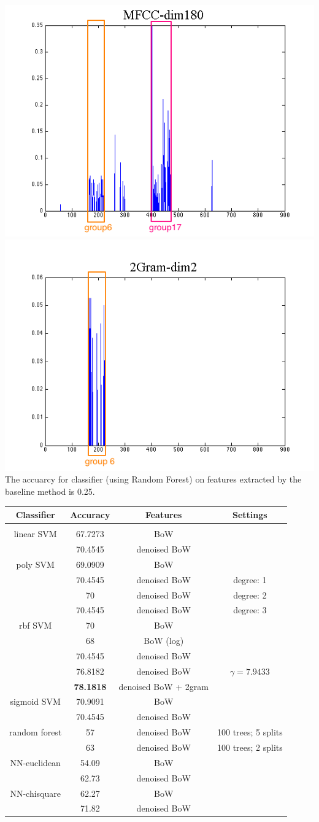 
\includegraphics[width=0.18 \linewidth]{./images/mfcc_180.png}
\includegraphics[width=0.19 \linewidth]{./images/ngram_202.png}\\
\footnotesize
The accuarcy for classifier (using Random Forest) on features extracted by the baseline method is 0.25. 


\begin{tabular}{cccc}
\multicolumn{1}{c}{\bf Classifier }&\multicolumn{1}{c}{\bf Accuracy}  &\multicolumn{1}{c}{\bf Features} &\multicolumn{1}{c}{\bf Settings}
\\ \hline \\
linear SVM		&67.7273 		&BoW 		&  \\
			& 70.4545  	& denoised BoW 	&  \\
poly SVM		&69.0909		&BoW 		&  \\
			& 70.4545  	& denoised BoW 	& degree: 1  \\
			& 70 			& denoised BoW 	& degree: 2  \\
			& 70.4545  	& denoised BoW 	& degree: 3  \\
rbf SVM       	&70 			&BoW 		&  \\
                     	&68  			&  BoW (log) 	&  \\
          		&70.4545  		&  denoised BoW 	&  \\
          		&76.8182  		&  denoised BoW 	&  $\gamma = 7.9433$ \\
          		&{\bf 78.1818}  	&  denoised BoW + 2gram 	&    \\
sigmoid SVM     	&70.9091		&BoW 		&  \\
       			&70.4545  		& denoised BoW 	&  \\
random forest    	&57			& denoised BoW	& 100 trees; 5 splits \\
       			&63  			& denoised BoW 	& 100 trees; 2 splits \\
NN-euclidean   	&54.09		& BoW	&  \\
       			&62.73		& denoised BoW 	&  \\
NN-chisquare	&62.27		& BoW	&  \\
       			&71.82		& denoised BoW 	& \\

\end{tabular}


